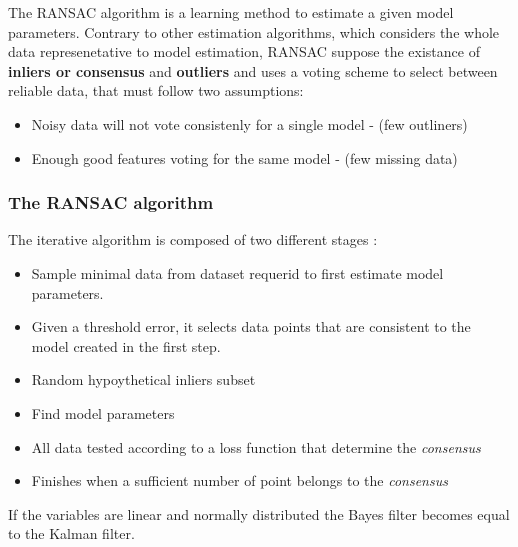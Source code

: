 The RANSAC algorithm is a learning method to estimate a given model parameters. Contrary to other estimation algorithms, which considers the whole data represenetative to model estimation, RANSAC suppose the existance of \textbf{inliers or consensus} and \textbf{outliers}  and uses a voting scheme to select between reliable data, that must follow two assumptions: 

\begin{itemize}
\item Noisy data will not vote consistenly for a single model - (few outliners) 
\item Enough good features voting for the same model - (few missing data)
\end{itemize}

\subsubsection{The RANSAC algorithm}

The iterative algorithm is composed of two different stages : 
\begin {itemize}
\item Sample minimal data from dataset requerid to first estimate model parameters.
\item Given a threshold error, it selects data points that are consistent to the model created in the first step.
\end {itemize}

\begin{itemize}
\item Random hypoythetical inliers subset
\item Find model parameters
\item All data tested according to a loss function that determine the \textit{consensus}
\item Finishes when a sufficient number of point belongs to the \textit{consensus}
\end{itemize}

{ \large{\color{blue} If the variables are linear and normally distributed the Bayes filter becomes equal to the Kalman filter.}}



